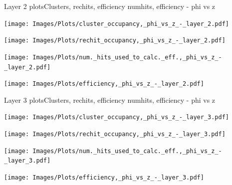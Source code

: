 \documentclass{beamer}
\begin{document}
\begin{frame}{Layer 2 plots}{Clusters, rechits, efficiency numhits, efficiency - phi vs z}
  \hspace{0.01\textwidth}%
  \begin{minipage}{0.45\textwidth}
    \centering
    \texttt{[image: Images/Plots/cluster\_occupancy,\_phi\_vs\_z\_-\_layer\_2.pdf]}
  \end{minipage}%
  \hspace{0.01\textwidth}%
  \begin{minipage}{0.45\textwidth}
    \centering
    \texttt{[image: Images/Plots/rechit\_occupancy,\_phi\_vs\_z\_-\_layer\_2.pdf]}
  \end{minipage}
  \vspace*{0.2cm}
  \begin{minipage}{0.45\textwidth}
    \centering
    \texttt{[image: Images/Plots/num.\_hits\_used\_to\_calc.\_eff.,\_phi\_vs\_z\_-\_layer\_2.pdf]}
  \end{minipage}%
  \hspace{0.01\textwidth}%
  \begin{minipage}{0.45\textwidth}
    \centering
    \texttt{[image: Images/Plots/efficiency,\_phi\_vs\_z\_-\_layer\_2.pdf]}
  \end{minipage}
\end{frame}

\begin{frame}{Layer 3 plots}{Clusters, rechits, efficiency numhits, efficiency - phi vs z}
  \hspace{0.01\textwidth}%
  \begin{minipage}{0.45\textwidth}
    \centering
    \texttt{[image: Images/Plots/cluster\_occupancy,\_phi\_vs\_z\_-\_layer\_3.pdf]}
  \end{minipage}%
  \hspace{0.01\textwidth}%
  \begin{minipage}{0.45\textwidth}
    \centering
    \texttt{[image: Images/Plots/rechit\_occupancy,\_phi\_vs\_z\_-\_layer\_3.pdf]}
  \end{minipage}
  \vspace*{0.2cm}
  \begin{minipage}{0.45\textwidth}
    \centering
    \texttt{[image: Images/Plots/num.\_hits\_used\_to\_calc.\_eff.,\_phi\_vs\_z\_-\_layer\_3.pdf]}
  \end{minipage}%
  \hspace{0.01\textwidth}%
  \begin{minipage}{0.45\textwidth}
    \centering
    \texttt{[image: Images/Plots/efficiency,\_phi\_vs\_z\_-\_layer\_3.pdf]}
  \end{minipage}
\end{frame}
\end{document}
